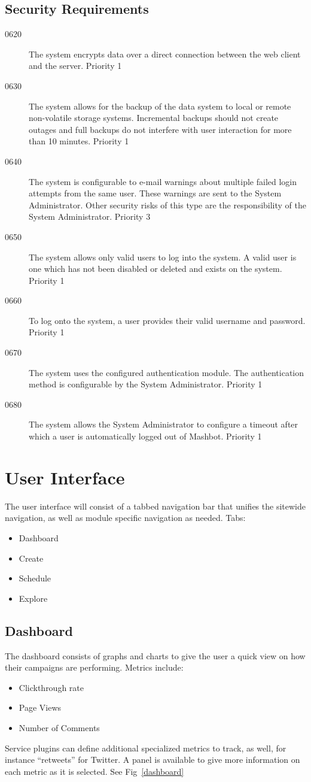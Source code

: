 \documentclass{article}
\begin{document}
\subsection{Security Requirements} %
\begin{description}
\item[0620] The system encrypts data over a direct connection between the
  web client and the server.  Priority 1
\item[0630] The system allows for the backup of the data system to local or
  remote non-volatile storage systems.  Incremental backups should not
  create outages and full backups do not interfere with user
  interaction for more than 10 minutes. Priority 1
\item[0640] The system is configurable to e-mail warnings about multiple
  failed login attempts from the same user. These warnings are sent to
  the System Administrator. Other security risks of this type are the
  responsibility of the System Administrator. Priority 3
\item[0650] The system allows only valid users to log into the system. A
  valid user is one which has not been disabled or deleted and exists
  on the system. Priority 1
\item[0660] To log onto the system, a user provides their valid username and
  password. Priority 1
\item[0670] The system uses the configured authentication module. The
  authentication method is configurable by the System
  Administrator. Priority 1
\item[0680] The system allows the System Administrator to configure a
  timeout after which a user is automatically logged out of
  Mashbot. Priority 1
\end{description}

\section{User Interface} %
The user interface will consist of a tabbed navigation bar that
unifies the sitewide navigation, as well as module specific navigation
as needed. Tabs:
\begin{itemize}
\item Dashboard
\item Create
\item Schedule
\item Explore
\end{itemize}
\subsection{Dashboard}
The dashboard consists of graphs and charts to give the user a quick
view on how their campaigns are performing.  Metrics include:
\begin{itemize}
\item Clickthrough rate
\item Page Views
\item Number of Comments
\end{itemize}
Service plugins can define additional specialized metrics to track, as
well, for instance ``retweets'' for Twitter.  A panel is available to
give more information on each metric as it is selected. See Fig~\ref{dashboard}
\end{document}
